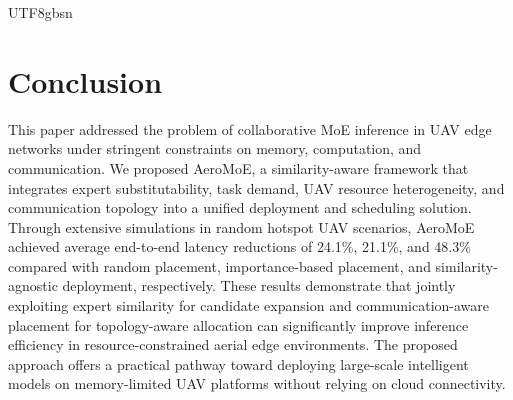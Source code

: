 \documentclass[journal]{IEEEtran}
\begin{document}
\begin{CJK*}{UTF8}{gbsn}

\section{Conclusion}
\label{sec:conclusion}




This paper addressed the problem of collaborative MoE inference in UAV edge networks under stringent constraints on memory, computation, and communication. We proposed AeroMoE, a similarity-aware framework that integrates expert substitutability, task demand, UAV resource heterogeneity, and communication topology into a unified deployment and scheduling solution. Through extensive simulations in random hotspot UAV scenarios, AeroMoE achieved average end-to-end latency reductions of 24.1\%, 21.1\%, and 48.3\% compared with random placement, importance-based placement, and similarity-agnostic deployment, respectively. These results demonstrate that jointly exploiting expert similarity for candidate expansion and communication-aware placement for topology-aware allocation can significantly improve inference efficiency in resource-constrained aerial edge environments. The proposed approach offers a practical pathway toward deploying large-scale intelligent models on memory-limited UAV platforms without relying on cloud connectivity.




\end{CJK*}
\end{document}
